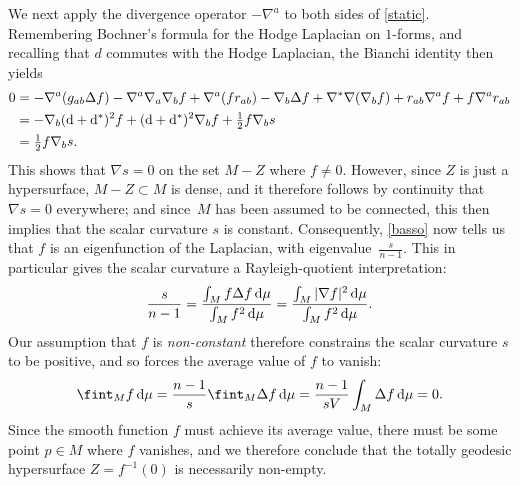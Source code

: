 \documentclass[10pt,a4paper]{amsart}
\numberwithin{equation}{section}
\begin{document}
We next apply the divergence operator $-\nabla^a$ to both sides of \eqref{static}. Remembering Bochner's formula for the Hodge Laplacian on $1$-forms, and recalling that $d$ commutes with the Hodge Laplacian, the Bianchi identity then yields
\begin{align*}
0&= -\nabla^a (g_{ab}\Delta f) - \nabla^a\nabla_a \nabla_b f + \nabla^a(fr_{ab})
 -\nabla_b \Delta f + \nabla^*\nabla (\nabla_b f )+ r_{ab}\nabla^af + f\nabla^ar_{ab}
\\&=-\nabla_b ({\rm d}+{\rm d}^*)^2 f + ({\rm d}+{\rm d}^*)^2 \nabla_b f+ \tfrac{1}{2} f\nabla_b s
\\&= \tfrac{1}{2} f\nabla_b s .
\end{align*}
This shows that $\nabla s=0$ on the set $M-Z$ where $f \neq 0$. However, since $Z$ is just a hypersurface,
$M-Z\subset M$ is dense, and it therefore follows by continuity that $\nabla s=0$ everywhere; and since~$M$ has been assumed to be connected, this then implies that the scalar curvature $s$ is constant.
Consequently, \eqref{basso} now tells us that $f$ is an eigenfunction of the Laplacian, with eigenvalue~$\frac{s}{n-1}$.
This in particular gives the scalar curvature a Rayleigh-quotient interpretation:
\begin{equation*}
\frac{s}{n-1} = \frac{\int_M f\Delta f\, {\rm d}\mu}{ \int_M f^2\, {\rm d}\mu} = \frac{\int_M|\nabla f|^2\, {\rm d}\mu}{ \int_M f^2\, {\rm d}\mu}.
\end{equation*}
Our assumption that $f$ is {\em non-constant} therefore constrains the scalar curvature $s$ to be {positive},
and so forces the average value of $f$ to vanish:
\begin{equation*}
\fint_M f\, {\rm d}\mu = \frac{n-1}{s}\fint_M \Delta f\, {\rm d}\mu = \frac{n-1}{sV}\int_M \Delta f\, {\rm d}\mu =0.
\end{equation*}
Since the smooth function $f$ must achieve its average value, there must be some point $p\in M$ where $f$ vanishes, and we
therefore conclude that
 the totally geodesic hypersurface $Z= f^{-1}(0)$ is necessarily non-empty.
\end{document}
